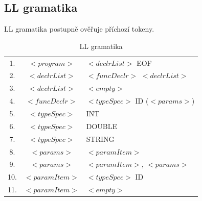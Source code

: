 \documentclass[a4paper, 11pt, titlepage]{article}
\begin{document}
\subsection{LL gramatika}
LL gramatika postupně ověřuje příchozí tokeny.   

\begin{table}[h]
\footnotesize
	\begin{center}
	\begin{tabular}{c c l}
	1.  & $<program>$ 	 & 	$<declrList>$ EOF \\ 
	2.  & $<declrList>$  &  $<funcDeclr>$ $<declrList>$ \\ 
	3.  & $<declrList>$  &  $<empty>$ \\ 
	4.  & $<funcDeclr>$  &  $<typeSpec>$ ID ($<params>$) \\
	5.  & $<typeSpec>$ 	 &  INT \\
	6.  & $<typeSpec>$   &  DOUBLE \\ 
	7.  & $<typeSpec>$ 	 &  STRING \\ 
	8.  & $<params>$ 	 & 	$<paramItem>$ \\ 
	9.  & $<params>$ 	 & 	$<paramItem>$, $<params>$ \\ 
	10. & $<paramItem>$  & 	$<typeSpec>$ ID\\ 
	11. & $<paramItem>$  & 	$<empty>$ \\ 
	\end{tabular}
	\caption{LL gramatika}
	\label{table_1:LL_gramatic}
	\end{center}
\end{table}
\end{document}
